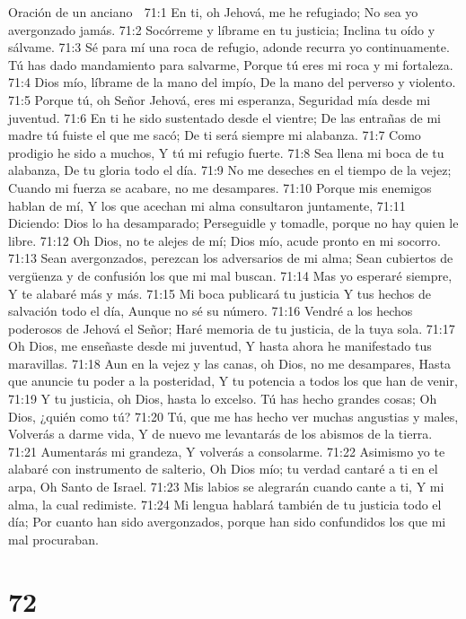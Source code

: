 Oración de un anciano 

71:1 En ti, oh Jehová, me he refugiado; 
No sea yo avergonzado jamás. 
71:2 Socórreme y líbrame en tu justicia; 
Inclina tu oído y sálvame. 
71:3 Sé para mí una roca de refugio, adonde recurra yo continuamente. 
Tú has dado mandamiento para salvarme, 
Porque tú eres mi roca y mi fortaleza. 
71:4 Dios mío, líbrame de la mano del impío, 
De la mano del perverso y violento. 
71:5 Porque tú, oh Señor Jehová, eres mi esperanza, 
Seguridad mía desde mi juventud. 
71:6 En ti he sido sustentado desde el vientre; 
De las entrañas de mi madre tú fuiste el que me sacó; 
De ti será siempre mi alabanza. 
71:7 Como prodigio he sido a muchos, 
Y tú mi refugio fuerte. 
71:8 Sea llena mi boca de tu alabanza, 
De tu gloria todo el día. 
71:9 No me deseches en el tiempo de la vejez; 
Cuando mi fuerza se acabare, no me desampares. 
71:10 Porque mis enemigos hablan de mí, 
Y los que acechan mi alma consultaron juntamente, 
71:11 Diciendo: Dios lo ha desamparado; 
Perseguidle y tomadle, porque no hay quien le libre. 
71:12 Oh Dios, no te alejes de mí; 
Dios mío, acude pronto en mi socorro. 
71:13 Sean avergonzados, perezcan los adversarios de mi alma; 
Sean cubiertos de vergüenza y de confusión los que mi mal buscan. 
71:14 Mas yo esperaré siempre, 
Y te alabaré más y más. 
71:15 Mi boca publicará tu justicia 
Y tus hechos de salvación todo el día, 
Aunque no sé su número. 
71:16 Vendré a los hechos poderosos de Jehová el Señor; 
Haré memoria de tu justicia, de la tuya sola. 
71:17 Oh Dios, me enseñaste desde mi juventud, 
Y hasta ahora he manifestado tus maravillas. 
71:18 Aun en la vejez y las canas, oh Dios, no me desampares, 
Hasta que anuncie tu poder a la posteridad, 
Y tu potencia a todos los que han de venir, 
71:19 Y tu justicia, oh Dios, hasta lo excelso. 
Tú has hecho grandes cosas; 
Oh Dios, ¿quién como tú? 
71:20 Tú, que me has hecho ver muchas angustias y males, 
Volverás a darme vida, 
Y de nuevo me levantarás de los abismos de la tierra. 
71:21 Aumentarás mi grandeza, 
Y volverás a consolarme. 
71:22 Asimismo yo te alabaré con instrumento de salterio, 
Oh Dios mío; tu verdad cantaré a ti en el arpa, 
Oh Santo de Israel. 
71:23 Mis labios se alegrarán cuando cante a ti, 
Y mi alma, la cual redimiste. 
71:24 Mi lengua hablará también de tu justicia todo el día; 
Por cuanto han sido avergonzados, porque han sido confundidos los que mi mal procuraban. 

\chapter{72}

